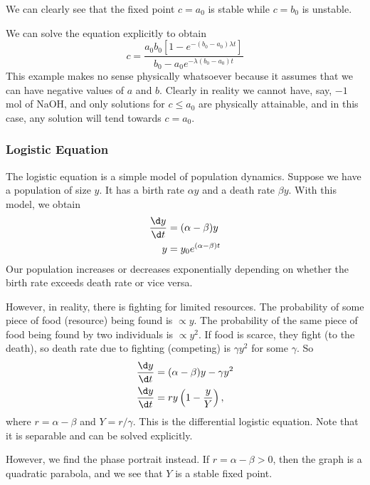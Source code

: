 \documentclass[a4paper]{article}
\begin{document}
\begin{eg}
We can clearly see that the fixed point $c = a_0$ is stable while $c = b_0$ is unstable.

\note We can solve the equation explicitly to obtain 
\[
c = \frac{a_0b_0[1 - e^{-(b_0 - a_0)\lambda t}]}{b_0 - a_0e^{-\lambda(b_0-a_0)t}}
\]
\note This example makes no sense physically whatsoever because it assumes that we can have negative values of $a$ and $b$. Clearly in reality we cannot have, say, $-1$ mol of NaOH, and only solutions for $c \leq a_0$ are physically attainable, and in this case, any solution will tend towards $c = a_0$.
\end{eg}

\subsubsection{Logistic Equation}
The logistic equation is a simple model of population dynamics. Suppose we have a population of size $y$. It has a birth rate $\alpha y$ and a death rate $\beta y$. With this model, we obtain
\begin{align*}
  \frac{\d y}{\d t} &= (\alpha - \beta)y\\
  y &= y_0 e^{(\alpha - \beta)t}
\end{align*}
Our population increases or decreases exponentially depending on whether the birth rate exceeds death rate or vice versa.

However, in reality, there is fighting for limited resources. The probability of some piece of food (resource) being found is $\propto y$. The probability of the same piece of food being found by two individuals is $\propto y^2$. If food is scarce, they fight (to the death), so death rate due to fighting (competing) is $\gamma y^2$ for some $\gamma$. So
\begin{align*}
  \frac{\d y}{\d t} &= (\alpha - \beta)y - \gamma y^2\\
  \frac{\d y}{\d t}&= ry \left(1 - \frac{y}{Y}\right),
\end{align*}
where $r = \alpha - \beta$ and $Y = r/\gamma$. This is the differential logistic equation. Note that it is separable and can be solved explicitly.

However, we find the phase portrait instead. If $r = \alpha - \beta > 0$, then the graph is a quadratic parabola, and we see that $Y$ is a stable fixed point.

\begin{center}
\end{center}
\end{document}
